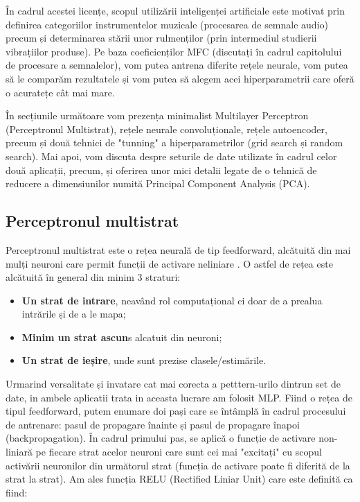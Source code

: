 \documentclass[a4paper,12pt]{report}
\begin{document}
   	În cadrul acestei licențe, scopul utilizării inteligenței artificiale este motivat prin definirea categoriilor instrumentelor muzicale (procesarea de semnale audio) precum și determinarea stării unor rulmenților (prin intermediul studierii vibrațiilor produse). Pe baza coeficienților MFC (discutați în cadrul capitolului de procesare a semnalelor), vom putea antrena diferite rețele neurale, vom putea să le comparăm rezultatele și vom putea să alegem acei hiperparametrii care oferă o acuratețe cât mai mare. 
   	
   	În secțiunile următoare vom prezența minimalist Multilayer Perceptron (Perceptronul Multistrat), rețele neurale convoluționale, rețele autoencoder, precum și două tehnici de "tunning" a hiperparametrilor (grid search și random search). Mai apoi, vom discuta despre seturile de date utilizate în cadrul celor două aplicații, precum, și oferirea unor mici detalii legate de o tehnică de reducere a dimensiunilor numită Principal Component Analysis (PCA).
   	
   	\clearpage
   	\subsection{Perceptronul multistrat}
   	Perceptronul multistrat este o rețea neurală de tip feedforward, alcătuită din mai mulți neuroni care permit funcții de activare neliniare \cite{ia_sasu}. O astfel de rețea este alcătuită în general din minim 3 straturi:
   	
   	\begin{itemize}
   		\item \textbf{Un strat de intrare}, neavând rol computațional ci doar de a prealua intrările și de a le mapa;
   		\item \textbf{Minim un strat ascun}s alcatuit din neuroni;
   		\item \textbf{Un strat de ieșire}, unde sunt prezise clasele/estimările.
   	\end{itemize}
   
    Urmarind versalitate și invatare cat mai corecta a petttern-urilo dintrun set de date, in ambele aplicatii trata in aceasta lucrare am folosit MLP. Fiind o rețea de tipul feedforward, putem enumare doi pași care se întâmplă în cadrul procesului de antrenare: pasul de propagare înainte și pasul de propagare înapoi (backpropagation). În cadrul primului pas, se aplică o funcție de activare non-liniară pe fiecare strat acelor neuroni care sunt cei mai "excitați" cu scopul activării neuronilor din următorul strat (funcția de activare poate fi diferită de la strat la strat). Am ales funcția RELU (Rectified Liniar Unit) care este definită ca fiind:
   
\end{document}
